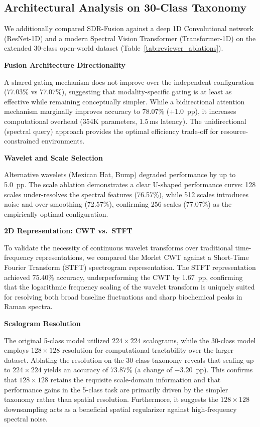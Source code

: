 \documentclass[preprint,12pt]{elsarticle}
\begin{document}
\subsection{Architectural Analysis on 30-Class Taxonomy}
We additionally compared SDR-Fusion against a deep 1D Convolutional
network (ResNet-1D) and a modern Spectral Vision Transformer
(Transformer-1D) on the extended 30-class open-world dataset
(Table~\ref{tab:reviewer_ablations}). 

\textbf{Fusion Architecture Directionality}
\label{sssec:abl_dir}

A shared gating mechanism does not improve over the independent configuration (77.03\% vs 77.07\%), suggesting that modality-specific gating is at least as effective while remaining conceptually simpler. While a bidirectional
attention mechanism marginally improves accuracy to 78.07\%
(+1.0~pp), it increases computational overhead (354K parameters,
1.5\,ms latency). The unidirectional (spectral query) approach
provides the optimal efficiency trade-off for resource-constrained
environments. 

\textbf{Wavelet and Scale Selection}
\label{sssec:abl_wavelet}

Alternative wavelets (Mexican Hat, Bump) degraded performance by up
to 5.0~pp. The scale ablation demonstrates a clear U-shaped
performance curve: 128 scales under-resolves the spectral features
(76.57\%), while 512 scales introduces noise and over-smoothing
(72.57\%), confirming 256 scales (77.07\%) as the empirically optimal
configuration. 

\textbf{2D Representation: CWT vs.\ STFT}
\label{sssec:abl_stft}

To validate the necessity of continuous wavelet transforms over
traditional time-frequency representations, we compared the Morlet
CWT against a Short-Time Fourier Transform (STFT) spectrogram
representation. The STFT representation achieved 75.40\% accuracy,
underperforming the CWT by 1.67~pp, confirming that the logarithmic
frequency scaling of the wavelet transform is uniquely suited for
resolving both broad baseline fluctuations and sharp biochemical peaks
in Raman spectra. 

\textbf{Scalogram Resolution}
\label{sssec:abl_res}

The original 5-class model utilized $224{\times}224$ scalograms, while
the 30-class model employs $128{\times}128$ resolution for
computational tractability over the larger dataset. Ablating the
resolution on the 30-class taxonomy reveals that scaling up to
$224{\times}224$ yields an accuracy of 73.87\% (a change of
$-3.20$~pp). This confirms that $128{\times}128$ retains the requisite
scale-domain information and that performance gains in the 5-class
task are primarily driven by the simpler taxonomy rather than spatial
resolution. Furthermore, it suggests the $128{\times}128$ downsampling
acts as a beneficial spatial regularizer against high-frequency
spectral noise. 
\end{document}

